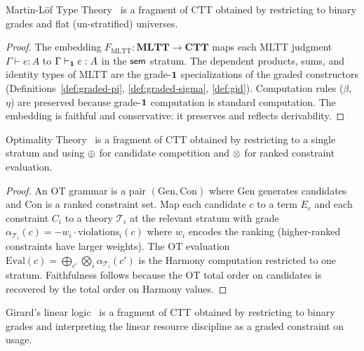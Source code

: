 \begin{theorem}
\label{thm:sub-mltt}
Martin-L\"of Type Theory~\cite{mlm1984} is a fragment of CTT obtained
by restricting to binary grades and flat (un-stratified) universes.
\end{theorem}

\begin{proof}
The embedding $F_{\mathrm{MLTT}} : \mathbf{MLTT} \to \mathbf{CTT}$
maps each MLTT judgment $\Gamma \vdash e : A$ to
$\Gamma \vdash_{\mathbf{1}} e : A$ in the $\mathsf{sem}$ stratum.  The
dependent products, sums, and identity types of MLTT are the
grade-$\mathbf{1}$ specializations of the graded constructors
(Definitions~\ref{def:graded-pi}, \ref{def:graded-sigma},
\ref{def:gid}).  Computation rules ($\beta$, $\eta$) are preserved
because grade-$\mathbf{1}$ computation is standard computation.
The embedding is faithful and conservative: it preserves
and reflects derivability.
\end{proof}

\begin{theorem}
\label{thm:sub-ot}
Optimality Theory~\cite{prince1993} is a fragment of CTT obtained
by restricting to a single stratum and using $\oplus$ for candidate
competition and $\otimes$ for ranked constraint evaluation.
\end{theorem}

\begin{proof}
An OT grammar is a pair $(\mathrm{Gen}, \mathrm{Con})$ where
$\mathrm{Gen}$ generates candidates and $\mathrm{Con}$ is a ranked
constraint set.  Map each candidate $c$ to a term $E_c$ and each
constraint $C_i$ to a theory $\mathcal{T}_i$ at the relevant
stratum with grade
$\alpha_{\mathcal{T}_i}(c) = -w_i \cdot \mathrm{violations}_i(c)$
where $w_i$ encodes the ranking (higher-ranked constraints have
larger weights).  The OT evaluation
$\mathrm{Eval}(c) = \bigoplus_{c'} \bigotimes_i
\alpha_{\mathcal{T}_i}(c')$
is the Harmony computation restricted to one stratum.
Faithfulness follows because the OT total order on candidates is
recovered by the total order on Harmony values.
\end{proof}

\begin{theorem}
\label{thm:sub-linear}
Girard's linear logic~\cite{girard1987} is a fragment of CTT
obtained by restricting to binary grades and interpreting the linear
resource discipline as a graded constraint on usage.
\end{theorem}


